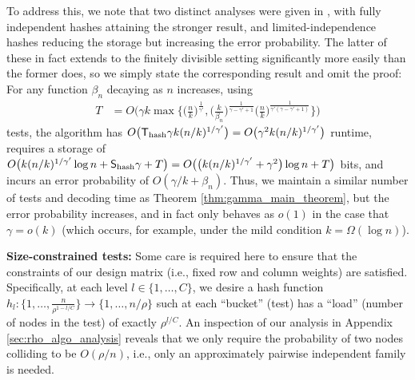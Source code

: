 To address this, we note that two distinct analyses were given in \cite{Eri20}, with fully independent hashes attaining the stronger result, and limited-independence hashes reducing the storage but increasing the error probability. The latter of these in fact extends to the finitely divisible setting significantly more easily than the former does, so we simply state the corresponding result and omit the proof: For any function $\beta_n$ decaying as $n$ increases, using
\begin{align}
    T&=O\bigg(\gamma k\max\bigg\{\Big(\frac{n}{k}\Big)^{\frac{1}{\gamma'}},
    \Big(\frac{k}{\beta_n}\Big)^{\frac{1}{\gamma-\gamma'+1}}\Big(\frac{n}{k}\Big)^{\frac{1}{\gamma'(\gamma-\gamma'+1)}}\bigg\}\bigg)
\end{align}
tests, the algorithm has $O\big(\mathsf{T}_{\textup{hash}}\gamma k(n/k)^{1/\gamma'}\big)=O\big(\gamma^2k(n/k)^{1/\gamma'}\big)$ runtime, requires a storage of $O\big(k(n/k)^{1/\gamma'}\log n+\mathsf{S}_{\textup{hash}}\gamma+T\big)=O\big(\big(k(n/k)^{1/\gamma'}+\gamma^2\big)\log n+T\big)$ bits, and incurs an error probability of $O(\gamma/k+\beta_n)$.  Thus, we maintain a similar number of tests and decoding time as Theorem \ref{thm:gamma_main_theorem}, but the error probability increases, and in fact only behaves as $o(1)$ in the case that $\gamma=o(k)$ (which occurs, for example, under the mild condition $k = \Omega(\log n)$).

\textbf{Size-constrained tests:} Some care is required here to ensure that the constraints of our design matrix (i.e., fixed row and column weights) are satisfied. Specifically, at each level $l\in\{1,\dots,C\}$, we desire a hash function $h_l:\big\{1,\dots,\frac{n}{\rho^{1-l/C}}\big\}\rightarrow\{1,\dots,n/\rho\}$ such at each ``bucket'' (test) has a ``load'' (number of nodes in the test) of exactly $\rho^{l/C}$. An inspection of our analysis in Appendix \ref{sec:rho_algo_analysis} reveals that we only require the probability of two nodes colliding to be $O(\rho/n)$, i.e., only an approximately pairwise independent family is needed.

